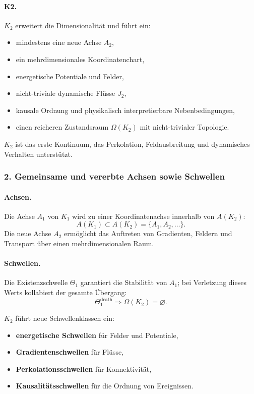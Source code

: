 \paragraph{K2.}
$K_2$ erweitert die Dimensionalität und führt ein:
\begin{itemize}
  \item mindestens eine neue Achse $A_2$,
  \item ein mehrdimensionales Koordinatenchart,
  \item energetische Potentiale und Felder,
  \item nicht-triviale dynamische Flüsse $J_2$,
  \item kausale Ordnung und physikalisch interpretierbare Nebenbedingungen,
  \item einen reicheren Zustandsraum $\Omega(K_2)$ mit nicht-trivialer Topologie.
\end{itemize}

$K_2$ ist das erste Kontinuum, das Perkolation, Feldausbreitung
und dynamisches Verhalten unterstützt.

\subsubsection{2. Gemeinsame und vererbte Achsen sowie Schwellen}

\paragraph{Achsen.}
Die Achse $A_1$ von $K_1$ wird zu einer Koordinatenachse innerhalb von
$A(K_2)$:
\[
A(K_1) \subset A(K_2) = \{A_1, A_2, \dots\}.
\]
Die neue Achse $A_2$ ermöglicht das Auftreten von Gradienten, Feldern und
Transport über einen mehrdimensionalen Raum.

\paragraph{Schwellen.}
Die Existenzschwelle $\Theta_1$ garantiert die Stabilität von $A_1$; bei
Verletzung dieses Werts kollabiert der gesamte Übergang:
\[
\Theta_1^{\mathrm{death}} \Rightarrow \Omega(K_2)=\varnothing.
\]

$K_2$ führt neue Schwellenklassen ein:
\begin{itemize}
  \item \textbf{energetische Schwellen} für Felder und Potentiale,
  \item \textbf{Gradientenschwellen} für Flüsse,
  \item \textbf{Perkolationsschwellen} für Konnektivität,
  \item \textbf{Kausalitätsschwellen} für die Ordnung von Ereignissen.
\end{itemize}

